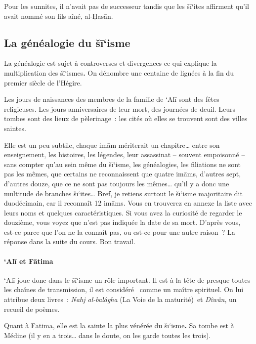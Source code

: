 Pour les sunnites, il n'avait pas de successeur tandis que les šī`ites
affirment qu'il avait nommé son fils aîné, al-Ḥasān.

 
\subsection{La généalogie du
šī`isme}\label{la-guxe9nuxe9alogie-du-ux161ux12bisme}

La généalogie est sujet à controverses et divergences ce qui explique la
multiplication des šī`ismes\textbf{.} On dénombre une centaine de
lignées à la fin du premier siècle de l'Hégire.

Les jours de naissances des membres de la famille de `Alī sont des fêtes
religieuses. Les jours anniversaires de leur mort, des journées de
deuil. Leurs tombes sont des lieux de pèlerinage~: les cités où elles se
trouvent sont des villes saintes.

Elle est un peu subtile, chaque imām mériterait un chapitre\ldots{}
entre son enseignement, les histoires, les légendes, leur assassinat --
souvent empoisonné -- sans compter qu'au sein même du šī`isme, les
généalogies, les filiations ne sont pas les mêmes, que certains ne
reconnaissent que quatre imāms, d'autres sept, d'autres douze, que ce ne
sont pas toujours les mêmes\ldots{} qu'il y a donc une multitude de
branches šī`ites\ldots{} Bref, je retiens surtout le šī`isme majoritaire
dit duodécimain, car il reconnaît 12 imāms. Vous en trouverez en annexe
la liste avec leurs noms et quelques caractéristiques. Si vous avez la
curiosité de regarder le douzième, vous voyez que n'est pas indiquée la
date de sa mort. D'après vous, est-ce parce que l'on ne la connaît pas,
ou est-ce pour une autre raison~? La réponse dans la suite du cours. Bon
travail.

 
\paragraph{`Alī et Fātima}\label{alux12b-et-fux101tima}

`Alī joue donc dans le šī`isme un rôle important. Il est à la tête de
presque toutes les chaînes de transmission, il est considéré ~comme un
maître spirituel. On lui attribue deux livres~: \emph{Nahj al-balâgha}
(La Voie de la maturité)~et \emph{Dîwân}, un recueil de poèmes.

Quant à Fātima, elle est la sainte la plus vénérée du šī`isme\textbf{.}
Sa tombe est à Médine (il y en a trois\ldots{} dans le doute, on les
garde toutes les trois).


